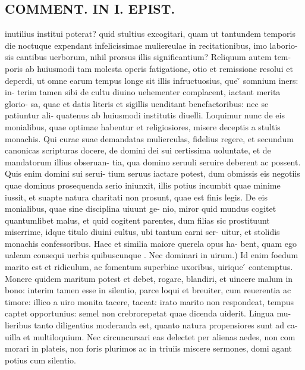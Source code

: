 \documentclass{article}
\begin{document}
\begin{pages}
\section*{COMMENT. IN I. EPIST. }
\marginpar{[ p.488 ]}\pstart inutilius institui poterat? quid stultius excogitari, quam ut tantundem temporis die noctuque expendant infelicissimae muliereulae in recitationibus, imo laborio- sis cantibus uerborum, nihil prorsus illis significantium? Reliquum autem tem- poris ab huiusmodi tam molesta operis fatigatione, otio et remissione resolui et deperdi, ut omne earum tempus longe sit illis infructuosius, que ̃ somnium iners: in- terim tamen sibi de cultu diuino uehementer complacent, iactant merita glorio- sa, quae et datis literis et sigillis uenditant benefactoribus: nec se patiuntur ali- quatenus ab huiusmodi institutis diuelli. Loquimur nunc de eis monialibus, quae optimae habentur et religiosiores, misere deceptis a stultis monachis. Qui curae suae demandatas mulierculas, fidelius regere, et secundum canonicas scripturas docere, de domini dei sui certissima uoluntate, et de mandatorum illius obseruan- tia, qua domino seruuli seruire deberent ac possent. Quis enim domini sui serui- tium seruus iactare potest, dum obmissis eis negotiis quae dominus prosequenda serio iniunxit, illis potius incumbit quae minime iussit, et suapte natura charitati non prosunt, quae est finis legis. De eis monialibus, quae sine disciplina uiuunt ge- nio, miror quid mundus cogitet quantumlibet malus, et quid cogitent parentes, dum filias sic prostituunt miserrime, idque titulo diuini cultus, ubi tantum carni ser- uitur, et stolidis monachis confessoribus. Haec et similia maiore querela opus ha- bent, quam ego ualeam consequi uerbis quibuscunque . Nec dominari in uirum.) Id enim foedum marito est et ridiculum, ac fomentum superbiae uxoribus, uirique ́ contemptus. Monere quidem maritum potest et debet, rogare, blandiri, et uincere malum in bono: interim tamen esse in silentio, parce loqui et breuiter, cum reuerentia ac timore: illico a uiro monita tacere, taceat: irato marito non respondeat, tempus captet opportunius: semel non crebrorepetat quae dicenda uiderit. Lingua mu- lieribus tanto diligentius moderanda est, quanto natura propensiores sunt ad ca- uilla et multiloquium. Nec circuncursari eas delectet per alienas aedes, non com morari in plateis, non foris plurimos ac in triuiis miscere sermones, domi agant potius cum silentio.  \pend
{}
{}

\end{pages}
\end{document}
